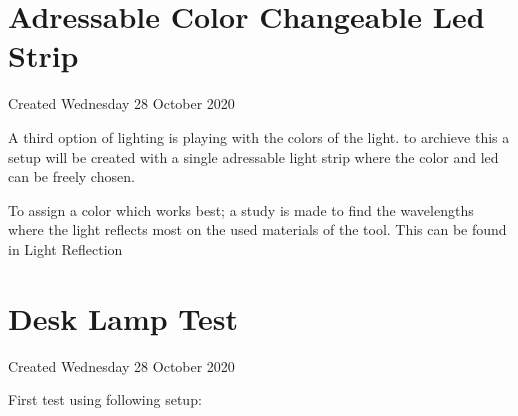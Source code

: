 \documentclass{article}
\begin{document}
		\section{Adressable Color Changeable Led Strip}

Created Wednesday 28 October 2020



A third option of lighting is playing with the colors of the light. to archieve this a setup will be created with a single adressable light strip where the color and led can be freely chosen. 



To assign a color which works best; a study is made to find the wavelengths where the light reflects most on the used materials of the tool. This can be found in  Light Reflection


		\section{Desk Lamp Test}

Created Wednesday 28 October 2020



First test using following setup:
\end{document}
